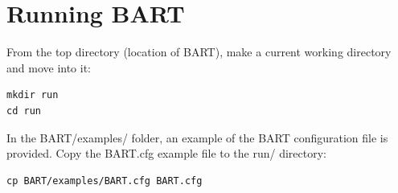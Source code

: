 \documentclass[letterpaper, 12pt]{article}
\begin{document}
\section{Running BART}
\label{sec:running}

From the top directory (location of BART), make a current working directory and move into it:

\begin{verbatim}
mkdir run
cd run
\end{verbatim}

\noindent
In the BART/examples/ folder, an example of the BART configuration
file is provided. Copy the BART.cfg example file to the run/ directory:

\begin{verbatim}
cp BART/examples/BART.cfg BART.cfg
\end{verbatim}
\end{document}
